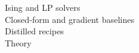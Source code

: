 Ising and LP solvers \citep{ax2611_14210,ax2611_21432}\\ Closed-form and gradient baselines \citep{zen24168084,ax2611_32332,ax2611_33133}\\ Distilled recipes \citep{ax2611_31233,ax2611_29882}\\ Theory \citep{zen23933590,zen24198536}
